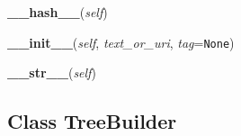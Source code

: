     \label{xml:etree:ElementTree:QName:__hash__}

    \vspace{0.5ex}

\hspace{.8\funcindent}\begin{boxedminipage}{\funcwidth}

    \raggedright \textbf{\_\_hash\_\_}(\textit{self})

\setlength{\parskip}{2ex}
\setlength{\parskip}{1ex}
    \end{boxedminipage}

    \label{xml:etree:ElementTree:QName:__init__}

    \vspace{0.5ex}

\hspace{.8\funcindent}\begin{boxedminipage}{\funcwidth}

    \raggedright \textbf{\_\_init\_\_}(\textit{self}, \textit{text\_or\_uri}, \textit{tag}={\tt None})

\setlength{\parskip}{2ex}
\setlength{\parskip}{1ex}
    \end{boxedminipage}

    \label{xml:etree:ElementTree:QName:__str__}

    \vspace{0.5ex}

\hspace{.8\funcindent}\begin{boxedminipage}{\funcwidth}

    \raggedright \textbf{\_\_str\_\_}(\textit{self})

\setlength{\parskip}{2ex}
\setlength{\parskip}{1ex}
    \end{boxedminipage}



\subsection{Class TreeBuilder}

